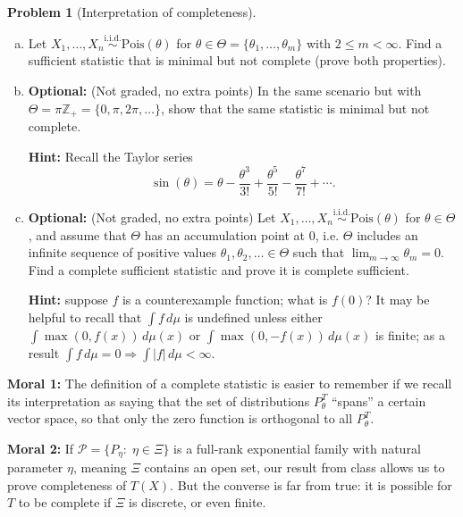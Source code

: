 \documentclass{article}
\newcommand{\cP}{\mathcal{P}}
\newcommand{\ZZ}{\mathbb{Z}}
\newcommand{\simiid}{\overset{\text{i.i.d.}}{\sim}}
\newcommand{\optional}{{\bf Optional:} (Not graded, no extra points) }
\theoremstyle{definition}
\newtheorem{problem}{Problem}
\begin{document}
\begin{problem}[Interpretation of completeness]
\begin{enumerate}[(a)]
\item Let $X_1,\ldots,X_n \simiid \text{Pois}(\theta)$ for $\theta\in \Theta = \{\theta_1,\ldots, \theta_m\}$ with $2 \leq m < \infty$. Find a sufficient statistic that is minimal but not complete (prove both properties).

  

\item \optional In the same scenario but with $\Theta = \pi\ZZ_+ = \{0, \pi, 2\pi, \ldots\}$, show that the same statistic is minimal but not complete.

{\bf Hint:} Recall the Taylor series 
\[
\sin(\theta) = \theta - \frac{\theta^3}{3!} + \frac{\theta^5}{5!} - \frac{\theta^7}{7!} + \cdots.
\]



\item \optional  Let $X_1,\ldots,X_n \simiid \text{Pois}(\theta)$ for $\theta\in \Theta$, and assume that $\Theta$ has an accumulation point at 0, i.e. $\Theta$ includes an infinite sequence of positive values $\theta_1,\theta_2,\ldots\in \Theta$ such that $\lim_{m\to\infty} \theta_m = 0$. Find a complete sufficient statistic and prove it is complete sufficient. 

{\bf Hint:} suppose $f$ is a counterexample function; what is $f(0)$? It may be helpful to recall that $\int f\,d  \mu$ is undefined unless either $\int \max(0,f(x))\,d  \mu(x)$ or $\int \max(0, -f(x))\,d  \mu(x)$ is finite; as a result $\int f\,d  \mu = 0 \Rightarrow \int|f|\,d  \mu < \infty$.


\end{enumerate}

{\bf Moral 1:} The definition of a complete statistic is easier to remember if we recall its interpretation as saying that the set of distributions $P_\theta^T$ ``spans'' a certain vector space, so that only the zero function is orthogonal to all $P_\theta^T$.

{\bf Moral 2:} If $\cP = \{P_\eta:\; \eta \in \Xi\}$ is a full-rank exponential family with natural parameter $\eta$, meaning $\Xi$ contains an open set, our result from class allows us to prove completeness of $T(X)$. But the converse is far from true: it is possible for $T$ to be complete if $\Xi$ is discrete, or even finite.
\end{problem}
\end{document}
